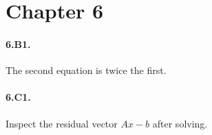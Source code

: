 \section*{Chapter 6}
\paragraph{6.B1.} The second equation is twice the first.
\paragraph{6.C1.} Inspect the residual vector $Ax-b$ after solving.
